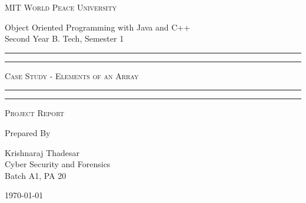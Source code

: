 \documentclass[11pt]{article}
\begin{document}
\begin{titlepage}
	\centering


	\huge\textsc{
		MIT World Peace University
	}\\

	\vspace{0.75\baselineskip} %

	\LARGE{
		Object Oriented Programming with Java and C++\\
		Second Year B. Tech, Semester 1
	}

	\vfill %


	\rule{\textwidth}{1.6pt}\vspace*{-\baselineskip}\vspace*{2pt}
	\rule{\textwidth}{0.6pt}
	\vspace{0.75\baselineskip} %



	\huge{\textsc{
			Case Study - Elements of an Array
		}} \\



	\vspace{0.5\baselineskip} %
	\rule{\textwidth}{0.6pt}\vspace*{-\baselineskip}\vspace*{2.8pt}
	\rule{\textwidth}{1.6pt}

	\vspace{1\baselineskip} %


	\LARGE\textsc{
		Project Report
	} %
	\vfill


	Prepared By
	\vspace{0.5\baselineskip} %

	\Large{
		Krishnaraj Thadesar \\
		Cyber Security and Forensics\\
		Batch A1, PA 20
	}


	\vspace{0.5\baselineskip} %
	\today

\end{titlepage}
\end{document}
